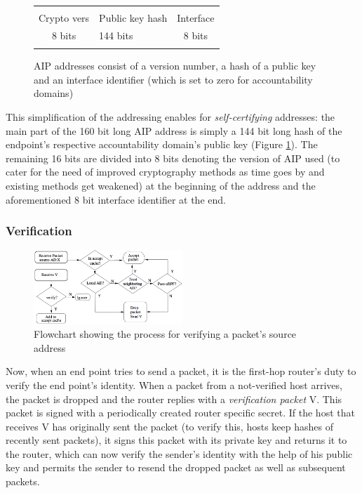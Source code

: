 \documentclass{acm_proc_article-sp}
\begin{document}
\begin{figure}[h!]
	\label{fig:aipadr}
	\begin{tabularx}{0.47\textwidth}{|c|C|c|}
		\hline & & \\
 		Crypto vers & Public key hash & Interface \\
		8 bits & 144 bits & 8 bits \\ & & \\
		\hline
	\end{tabularx}
	\caption{AIP addresses consist of a version number, a hash of a public key and an interface identifier 		(which is set to zero for accountability domains) \cite{aip}}
\end{figure}

This simplification of the addressing enables for \emph{self-certifying} addresses: the main part of the 160 bit long AIP address is simply a 144 bit long hash of the endpoint's respective accountability domain's public key (Figure \ref{fig:aipadr}). The remaining 16 bits are divided into 8 bits denoting the version of AIP used (to cater for the need of improved cryptography methods as time goes by and existing methods get weakened) at the beginning of the address and the aforementioned 8 bit interface identifier at the end.

\subsubsection{Verification}
\begin{figure}[t]
  \includegraphics[width=0.5\textwidth]{images/aipflow.PNG}
  \caption{Flowchart showing the process for verifying a packet's source address \cite{aip}}
  \label{fig:aipflow}
\end{figure}
Now, when an end point tries to send a packet, it is the first-hop router's duty to verify the end point's identity. When a packet from a not-verified host arrives, the packet is dropped and the router replies with a \emph{verification packet} V. This packet is signed with a periodically created router specific secret. If the host that receives V has originally sent the packet (to verify this, hosts keep hashes of recently sent packets), it signs this packet with its private key and returns it to the router, which can now verify the sender's identity with the help of his public key and permits the sender to resend the dropped packet as well as subsequent packets.
\end{document}
